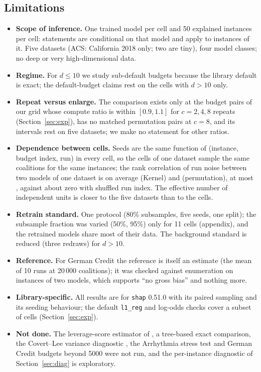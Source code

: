 \subsection{Limitations}
\label{sec:limits}
\begin{itemize}
\item \textbf{Scope of inference.} One trained model per cell and 50 explained instances per cell: statements are conditional on that model and apply to instances of it. Five datasets (ACS: California 2018 only; two are tiny), four model classes; no deep or very high-dimensional data.
\item \textbf{Regime.} For $d\le10$ we study sub-default budgets because the library default is exact; the default-budget claims rest on the cells with $d>10$ only.
\item \textbf{Repeat versus enlarge.} The comparison exists only at the budget pairs of our grid whose compute ratio is within $[0.9,1.1]$ for $c=2,4,8$ repeats (Section~\ref{sec:exp}), has no matched permutation pairs at $c=8$, and its intervals rest on five datasets; we make no statement for other ratios.
\item \textbf{Dependence between cells.} Seeds are the same function of (instance, budget index, run) in every cell, so the cells of one dataset sample the same coalitions for the same instances; the rank correlation of run noise between two models of one dataset is on average \numseedCorrMeanK{} (Kernel) and \numseedCorrMeanP{} (permutation), at most \numseedCorrMaxK{}, against about zero with shuffled run index. The effective number of independent units is closer to the five datasets than to the \numnCells{} cells.
\item \textbf{Retrain standard.} One protocol (80\% subsamples, five seeds, one split); the subsample fraction was varied (50\%, 95\%) only for 11 cells (appendix), and the retrained models share most of their data. The background standard is reduced (three redraws) for $d>10$.
\item \textbf{Reference.} For German Credit the reference is itself an estimate (the mean of 10 runs at 20\,000 coalitions); it was checked against enumeration on \numrefN{} instances of two models, which supports ``no gross bias'' and nothing more.
\item \textbf{Library-specific.} All results are for \texttt{shap} 0.51.0 with its paired sampling and its seeding behaviour; the default \texttt{l1\_reg} and log-odds checks cover a subset of cells (Section~\ref{sec:exp}).
\item \textbf{Not done.} The leverage-score estimator of \citet{musco2024leverage}, a tree-based exact comparison, the Covert--Lee variance diagnostic \citep{covert2020improving}, the Arrhythmia stress test and German Credit budgets beyond 5000 were not run, and the per-instance diagnostic of Section~\ref{sec:diag} is exploratory.
\end{itemize}
